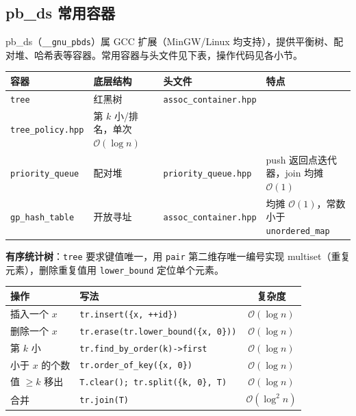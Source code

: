 \subsection{pb\_ds 常用容器}

pb\_ds（\texttt{\_\_gnu\_pbds}）属 GCC 扩展（MinGW/Linux 均支持），提供平衡树、配对堆、哈希表等容器。常用容器与头文件见下表，操作代码见各小节。

\begin{center}
\small
\begin{tabular}{lp{1.7cm}p{4.4cm}p{4.4cm}}
\toprule
容器 & 底层结构 & 头文件 & 特点 \\
\midrule
\texttt{tree} & 红黑树 & \texttt{assoc\_container.hpp}\\\texttt{tree\_policy.hpp} & 第 $k$ 小/排名，单次 $\mathcal{O}(\log n)$ \\
\texttt{priority\_queue} & 配对堆 & \texttt{priority\_queue.hpp} & push 返回点迭代器，join 均摊 $\mathcal{O}(1)$ \\
\texttt{gp\_hash\_table} & 开放寻址 & \texttt{assoc\_container.hpp} & 均摊 $\mathcal{O}(1)$，常数小于 \texttt{unordered\_map} \\
\bottomrule
\end{tabular}
\end{center}

\textbf{有序统计树}：\texttt{tree} 要求键值唯一，用 \texttt{pair} 第二维存唯一编号实现 multiset（重复元素），删除重复值用 \texttt{lower\_bound} 定位单个元素。

\begin{center}
\small
\begin{tabular}{lp{7cm}c}
\toprule
操作 & 写法 & 复杂度 \\
\midrule
插入一个 $x$ & \texttt{tr.insert(\{x, ++id\})} & $\mathcal{O}(\log n)$ \\
删除一个 $x$ & \texttt{tr.erase(tr.lower\_bound(\{x, 0\}))} & $\mathcal{O}(\log n)$ \\
第 $k$ 小 & \texttt{tr.find\_by\_order(k)->first} & $\mathcal{O}(\log n)$ \\
小于 $x$ 的个数 & \texttt{tr.order\_of\_key(\{x, 0\})} & $\mathcal{O}(\log n)$ \\
值 $\ge k$ 移出 & \texttt{T.clear(); tr.split(\{k, 0\}, T)} & $\mathcal{O}(\log n)$ \\
合并 & \texttt{tr.join(T)} & $\mathcal{O}(\log^2 n)$ \\
\bottomrule
\end{tabular}
\end{center}

